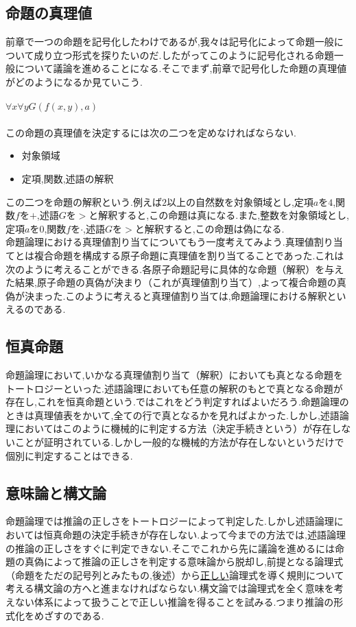 \documentclass[10pt,b5paper,papersize,dvipdfmx]{jsbook}
\begin{document}
\subsection{命題の真理値}
前章で一つの命題を記号化したわけであるが,我々は記号化によって命題一般について成り立つ形式を探りたいのだ.したがってこのように記号化される命題一般について議論を進めることになる.そこでまず,前章で記号化した命題の真理値がどのようになるか見ていこう. \\
\\
$\forall x\forall yG(f(x,y),a)$ \\
\\
この命題の真理値を決定するには次の二つを定めなければならない.
\begin{itemize}
\item 対象領域
\item 定項,関数,述語の解釈
\end{itemize}
この二つを命題の解釈という.例えば$2$以上の自然数を対象領域とし,定項$a$を$4$,関数$f$を$+$,述語$G$を$>$と解釈すると,この命題は真になる.また,整数を対象領域とし,定項$a$を$0$,関数$f$を$\cdot$,述語$G$を$>$と解釈すると,この命題は偽になる. \\
命題論理における真理値割り当てについてもう一度考えてみよう.真理値割り当てとは複合命題を構成する原子命題に真理値を割り当てることであった.これは次のように考えることができる.各原子命題記号に具体的な命題（解釈）を与えた結果,原子命題の真偽が決まり（これが真理値割り当て）,よって複合命題の真偽が決まった.このように考えると真理値割り当ては,命題論理における解釈といえるのである.

\subsection{恒真命題}
命題論理において,いかなる真理値割り当て（解釈）においても真となる命題をトートロジーといった.述語論理においても任意の解釈のもとで真となる命題が存在し,これを恒真命題という.ではこれをどう判定すればよいだろう.命題論理のときは真理値表をかいて,全ての行で真となるかを見ればよかった.しかし,述語論理においてはこのように機械的に判定する方法（決定手続きという）が存在しないことが証明されている.しかし一般的な機械的方法が存在しないというだけで個別に判定することはできる.

\subsection{意味論と構文論}
命題論理では推論の正しさをトートロジーによって判定した.しかし述語論理においては恒真命題の決定手続きが存在しない.よって今までの方法では,述語論理の推論の正しさをすぐに判定できない.そこでこれから先に議論を進めるには命題の真偽によって推論の正しさを判定する意味論から脱却し,前提となる論理式（命題をただの記号列とみたもの,後述）から\underline{正しい}論理式を導く規則について考える構文論の方へと進まなければならない.構文論では論理式を全く意味を考えない体系によって扱うことで正しい推論を得ることを試みる.つまり推論の形式化をめざすのである.\par
\end{document}

